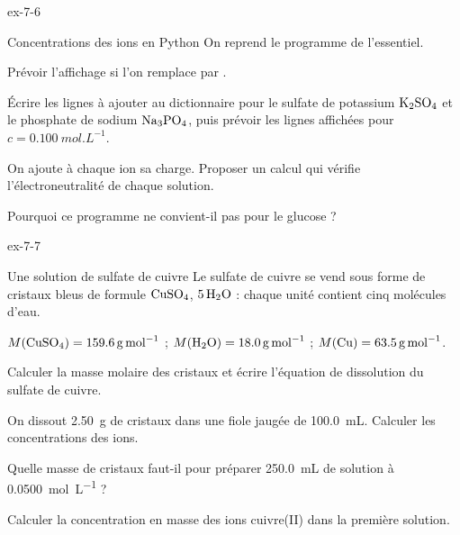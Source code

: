 \begin{blocLivre}{ex-7-6}
\begin{exercice}[2]{Concentrations des ions en Python}
On reprend le programme de l'essentiel.
\begin{questions}
\item {}Prévoir l'affichage si l'on remplace  par .
\item Écrire les lignes à ajouter au dictionnaire  pour le sulfate de potassium $\ce{K2SO4}$ et le phosphate de sodium $\ce{Na3PO4}$,
puis prévoir les lignes affichées pour $c=\qty{0,100}{mol.L^{-1}}$.
\item On ajoute à chaque ion sa charge. Proposer un calcul qui vérifie l'électroneutralité de chaque solution.
\item Pourquoi ce programme ne convient-il pas pour le glucose ?
\end{questions}
\end{exercice}
\end{blocLivre}
\begin{blocLivre}{ex-7-7}
\begin{exercice}[2]{Une solution de sulfate de cuivre}
Le sulfate de cuivre se vend sous forme de cristaux bleus de formule $\ce{CuSO4}$, $5\,\ce{H2O}$ : chaque unité contient cinq molécules d'eau.
\begin{donnees}
$M(\ce{CuSO4})=\qty{159,6}{g.mol^{-1}}$ ; $M(\ce{H2O})=\qty{18,0}{g.mol^{-1}}$ ; $M(\ce{Cu})=\qty{63,5}{g.mol^{-1}}$.
\end{donnees}
\begin{questions}
\item Calculer la masse molaire des cristaux et écrire l'équation de dissolution du sulfate de cuivre.
\item On dissout \qty{2,50}{g} de cristaux dans une fiole jaugée de \qty{100,0}{mL}. Calculer les concentrations des ions.
\item Quelle masse de cristaux faut-il pour préparer \qty{250,0}{mL} de solution à \qty{0,0500}{mol.L^{-1}} ?
\item Calculer la concentration en masse des ions cuivre(II) dans la première solution.
\end{questions}
\end{exercice}
\end{blocLivre}
